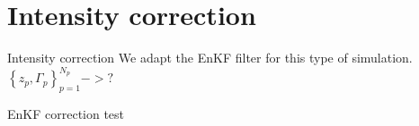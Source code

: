 \documentclass[aspectratio=169]{beamer} %
\begin{document}
\section{Intensity correction}

\begin{frame}{Intensity correction}
    We adapt the EnKF filter for this type of simulation.
    $\left\{z_p, \Gamma_p\right\}_{p=1}^{N_p} -> ?$

    \begin{block}{EnKF correction}
        test
    \end{block}
\end{frame}



\end{document}

